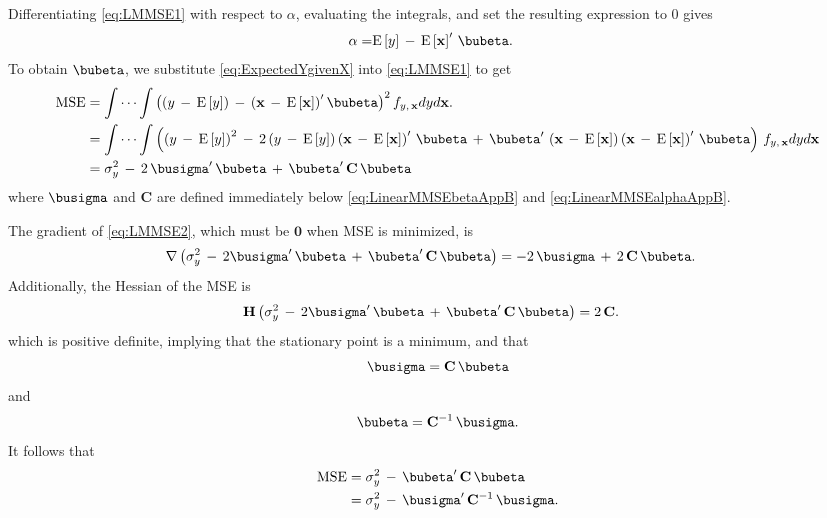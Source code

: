 \documentclass[graybox,envcountchap,sectrefs]{svmono}\usepackage[]{graphicx}\usepackage[]{xcolor}
\begin{document}
\begin{appendices}
Differentiating \eqref{eq:LMMSE1} with respect to $\alpha$, evaluating
the integrals, and set the resulting expression to 0 gives
\begin{align}
\alpha= & \mathrm{E}\left[y\right]\,-\,\mathrm{E}\left[\mathrm{\mathbf{x}}\right]^{\prime}\,\bubeta.\label{eq:ExpectedYgivenX}
\end{align}
To obtain $\bubeta$, we substitute \eqref{eq:ExpectedYgivenX} into
\eqref{eq:LMMSE1} to get
\begin{align}
\mathrm{MSE} & =\idotsint\left(\left(y\,-\,\mathrm{E}\left[y\right]\right)\,-\,\left(\mathrm{\mathbf{x}}\,-\,\mathrm{E}\left[\mathrm{\mathbf{x}}\right]\right)^{\prime}\bubeta\right)^{2}f_{y,\,\mathrm{\mathbf{x}}}dyd\mathbf{x}.\nonumber \\
 & =\idotsint\left(\left(y\,-\,\mathrm{E}\left[y\right]\right)^{2}\,-\,2\left(y\,-\,\mathrm{E}\left[y\right]\right)\left(\mathrm{\mathbf{x}}\,-\,\mathrm{E}\left[\mathrm{\mathbf{x}}\right]\right)^{\prime}\,\bubeta\,+\,\bubeta^{\prime}\,\left(\mathrm{\mathbf{x}}\,-\,\mathrm{E}\left[\mathrm{\mathbf{x}}\right]\right)\left(\mathrm{\mathbf{x}}\,-\,\mathrm{E}\left[\mathrm{\mathbf{x}}\right]\right)^{\prime}\,\bubeta\right)\,f_{y,\mathrm{\,\mathbf{x}}}dyd\mathbf{x}\nonumber \\
 & =\sigma_{y}^{2}\,-\,2\,\busigma^{\prime}\,\bubeta\,+\,\bubeta^{\prime}\,\mathrm{\mathbf{C}}\,\bubeta\label{eq:LMMSE2}
\end{align}
where $\busigma$ and $\mathrm{\mathbf{C}}$ are defined immediately
below \eqref{eq:LinearMMSEbetaAppB} and \eqref{eq:LinearMMSEalphaAppB}.

The gradient of \eqref{eq:LMMSE2}, which must be $\boldsymbol{0}$
when MSE is minimized, is
\begin{align}
\nabla\left(\sigma_{y}^{2}\,-\,2\busigma^{\prime}\,\bubeta\,+\,\bubeta^{\prime}\,\mathrm{\mathbf{C}}\,\bubeta\right) & =-2\,\busigma\,+\,2\,\mathrm{\mathbf{C}}\,\bubeta.\label{eq:LMMSE3}
\end{align}
Additionally, the Hessian of the MSE is
\begin{align}
\mathrm{\mathbf{H}}\left(\sigma_{y}^{2}\,-\,2\busigma^{\prime}\,\bubeta\,+\,\bubeta^{\prime}\,\mathrm{\mathbf{C}}\,\bubeta\right) & =2\,\mathrm{\mathbf{C}}.\label{eq:LMMSE3a}
\end{align}
which is positive definite, implying that the stationary point is
a minimum, and that
\begin{equation}
\busigma=\mathrm{\mathbf{C}}\,\bubeta\label{eq:LMMSE4}
\end{equation}
and
\begin{equation}
\bubeta=\mathrm{\mathbf{C}^{-1}}\,\busigma.\label{eq:LMMSE5}
\end{equation}
It follows that 
\begin{align}
\mathrm{MSE} & =\sigma_{y}^{2}\,-\,\bubeta^{\prime}\,\mathrm{\mathbf{C}}\,\bubeta\nonumber \\
 & =\sigma_{y}^{2}\,-\,\busigma^{\prime}\,\mathrm{\mathbf{C}^{-1}}\,\busigma.\label{eq:LMMSE6}
\end{align}


\end{appendices}
\end{document}
